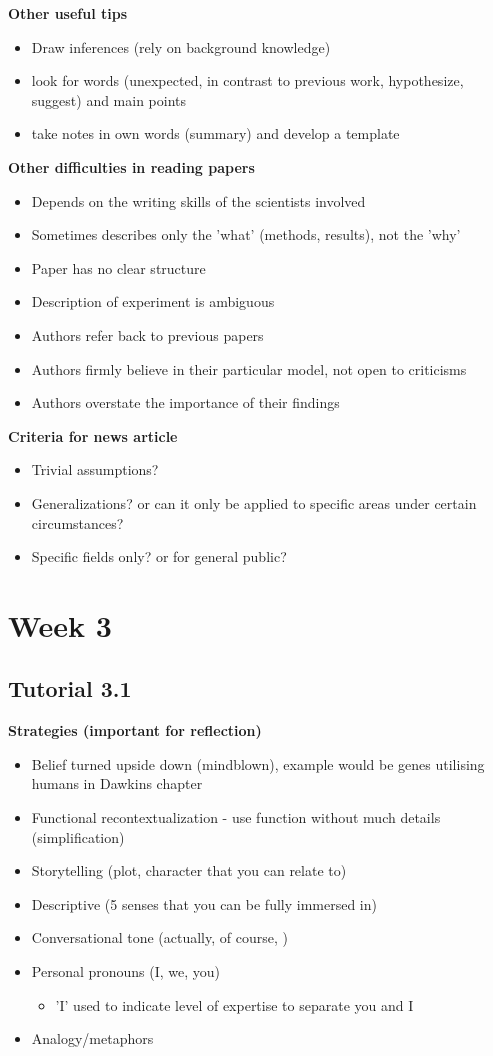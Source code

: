 \documentclass{article}
\begin{document}
\begin{multicols}{2}
\textbf{Other useful tips}
\begin{itemize}
	\item Draw inferences (rely on background knowledge)
	\item look for words (unexpected, in contrast to previous work, hypothesize, suggest) and main points
	\item take notes in own words (summary) and develop a template
\end{itemize}
\textbf{Other difficulties in reading papers}
\begin{itemize}
	\item Depends on the writing skills of the scientists involved
	\item Sometimes describes only the 'what' (methods, results), not the 'why'
	\item Paper has no clear structure
	\item Description of experiment is ambiguous
	\item Authors refer back to previous papers
	\item Authors firmly believe in their particular model, not open to criticisms
	\item Authors overstate the importance of their findings
\end{itemize}

\textbf{Criteria for news article}
\begin{itemize}
	\item Trivial assumptions?
	\item Generalizations? or can it only be applied to specific areas under certain circumstances?
	\item Specific fields only? or for general public?

\end{itemize}


\section{Week 3}
\subsection{Tutorial 3.1}
\textbf{Strategies (important for reflection)}
\begin{itemize}
	\item Belief turned upside down (mindblown), example would be genes utilising humans in Dawkins chapter
	\item Functional recontextualization - use function without much details (simplification)
	\item Storytelling (plot, character that you can relate to)
	\item Descriptive (5 senses that you can be fully immersed in)
	\item Conversational tone (actually, of course, )
	\item Personal pronouns (I, we, you)
	\begin{itemize}
		\item 'I' used to indicate level of expertise to separate you and I
	\end{itemize}
	\item Analogy/metaphors
\end{itemize}

\end{multicols}
\end{document}
